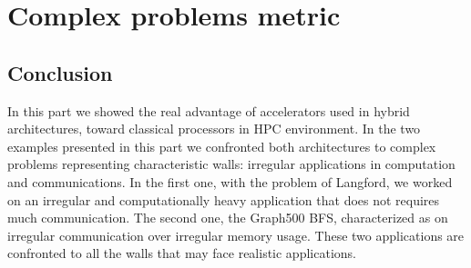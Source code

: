 \part{Complex problems metric}










\chapter*{Conclusion}
In this part we showed the real advantage of accelerators used in hybrid architectures, toward classical processors in HPC environment. 
In the two examples presented in this part we confronted both architectures to complex problems representing characteristic walls: irregular applications in computation and communications. 
In the first one, with the problem of Langford, we worked on an irregular and computationally heavy application that does not requires much communication. 
The second one, the Graph500 BFS, characterized as on irregular communication over irregular memory usage. 
These two applications are confronted to all the walls that may face realistic applications.

